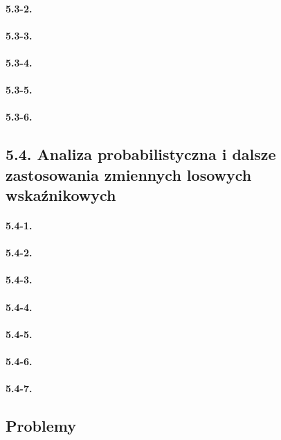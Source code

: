 \paragraph{5.3-2.}
\paragraph{5.3-3.}
\paragraph{5.3-4.}
\paragraph{5.3-5.}
\paragraph{5.3-6.}

\subsection*{5.4. Analiza probabilistyczna i dalsze zastosowania zmiennych losowych wskaźnikowych}

\paragraph{5.4-1.}
\paragraph{5.4-2.}
\paragraph{5.4-3.}
\paragraph{5.4-4.}
\paragraph{5.4-5.}
\paragraph{5.4-6.}
\paragraph{5.4-7.}

\subsection*{Problemy}

